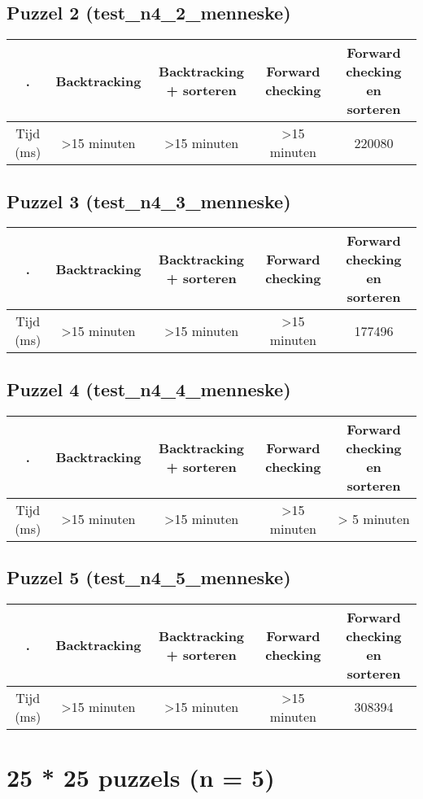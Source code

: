 \documentclass[]{report}
\begin{document}
\begin{appendices}
\subsection{Puzzel 2 (test\_n4\_2\_menneske)}
\begin{tabular}{|c||c|c|c|c|}
\hline . & Backtracking & Backtracking + sorteren & Forward checking & Forward checking en sorteren \\ 
\hline \hline Tijd (ms) & >15 minuten & >15 minuten & >15 minuten & 220080 \\ 
\hline 
\end{tabular}
\subsection{Puzzel 3 (test\_n4\_3\_menneske)}
\begin{tabular}{|c||c|c|c|c|}
\hline . & Backtracking & Backtracking + sorteren & Forward checking & Forward checking en sorteren \\ 
\hline \hline Tijd (ms) & >15 minuten & >15 minuten & >15 minuten & 177496 \\ 
\hline 
\end{tabular}
\subsection{Puzzel 4 (test\_n4\_4\_menneske)}
\begin{tabular}{|c||c|c|c|c|}
\hline . & Backtracking & Backtracking + sorteren & Forward checking & Forward checking en sorteren \\ 
\hline \hline Tijd (ms) & >15 minuten & >15 minuten & >15 minuten & > 5 minuten \\ 
\hline 
\end{tabular}
\subsection{Puzzel 5 (test\_n4\_5\_menneske)}
\begin{tabular}{|c||c|c|c|c|}
\hline . & Backtracking & Backtracking + sorteren & Forward checking & Forward checking en sorteren \\ 
\hline \hline Tijd (ms) & >15 minuten & >15 minuten & >15 minuten & 308394 \\ 
\hline 
\end{tabular}
\section{25 * 25 puzzels (n = 5)}

\end{appendices}
\end{document}
